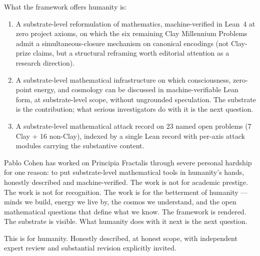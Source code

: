 \documentclass[11pt,a4paper]{article}
\theoremstyle{plain}
\theoremstyle{definition}
\begin{document}
What the framework offers humanity is:
\begin{enumerate}[label=(\textbf{\alph*})]
\item A substrate-level reformulation of mathematics, machine-verified
  in Lean~4 at zero project axioms, on which the six remaining Clay
  Millennium Problems admit a simultaneous-closure mechanism on
  canonical encodings (not Clay-prize claims, but a structural
  reframing worth editorial attention as a research direction).
\item A substrate-level mathematical infrastructure on which
  consciousness, zero-point energy, and cosmology can be discussed
  in machine-verifiable Lean form, at substrate-level scope, without
  ungrounded speculation. The substrate is the contribution; what
  serious investigators do with it is the next question.
\item A substrate-level mathematical attack record on 23 named open
  problems (7 Clay + 16 non-Clay), indexed by a single Lean record
  with per-axis attack modules carrying the substantive content.
\end{enumerate}
Pablo Cohen has worked on Principia Fractalis through severe
personal hardship for one reason: to put substrate-level
mathematical tools in humanity's hands, honestly described and
machine-verified. The work is not for academic prestige. The work is
not for recognition. The work is for the betterment of humanity ---
minds we build, energy we live by, the cosmos we understand, and the
open mathematical questions that define what we know. The framework
is rendered. The substrate is visible. What humanity does with it
next is the next question.

This is for humanity. Honestly described, at honest scope, with
independent expert review and substantial revision explicitly
invited.
\end{document}
